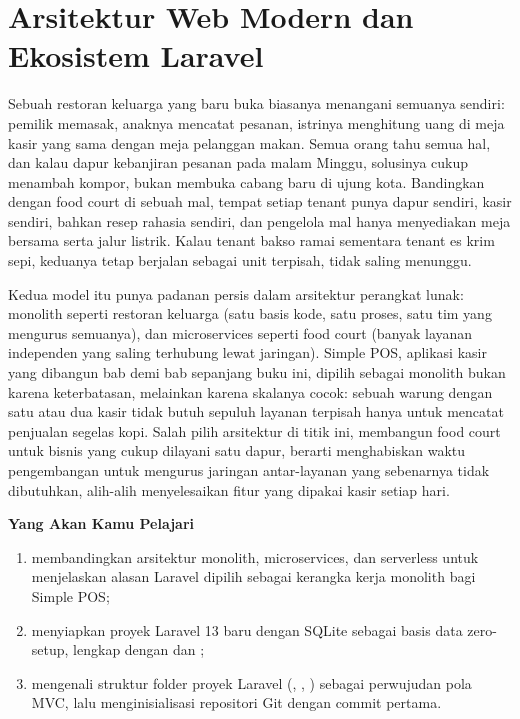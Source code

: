 
\chapter{Arsitektur Web Modern dan Ekosistem Laravel}
\label{ch:arsitektur-web-modern}


Sebuah restoran keluarga yang baru buka biasanya menangani semuanya sendiri:
pemilik memasak, anaknya mencatat pesanan, istrinya menghitung uang di meja
kasir yang sama dengan meja pelanggan makan. Semua orang tahu semua hal, dan
kalau dapur kebanjiran pesanan pada malam Minggu, solusinya cukup menambah
kompor, bukan membuka cabang baru di ujung kota. Bandingkan dengan food
court di sebuah mal, tempat setiap tenant punya dapur sendiri, kasir
sendiri, bahkan resep rahasia sendiri, dan pengelola mal hanya menyediakan
meja bersama serta jalur listrik. Kalau tenant bakso ramai sementara tenant
es krim sepi, keduanya tetap berjalan sebagai unit terpisah, tidak saling
menunggu.

Kedua model itu punya padanan persis dalam arsitektur perangkat lunak:
monolith seperti restoran keluarga (satu basis kode, satu proses, satu tim
yang mengurus semuanya), dan microservices seperti food court (banyak
layanan independen yang saling terhubung lewat jaringan). Simple POS,
aplikasi kasir yang dibangun bab demi bab sepanjang buku ini, dipilih
sebagai monolith bukan karena keterbatasan, melainkan karena skalanya
cocok: sebuah warung dengan satu atau dua kasir tidak butuh sepuluh layanan
terpisah hanya untuk mencatat penjualan segelas kopi. Salah pilih arsitektur
di titik ini, membangun food court untuk bisnis yang cukup dilayani satu
dapur, berarti menghabiskan waktu pengembangan untuk mengurus jaringan
antar-layanan yang sebenarnya tidak dibutuhkan, alih-alih menyelesaikan
fitur yang dipakai kasir setiap hari.

\textbf{Yang Akan Kamu Pelajari}

\begin{enumerate}
  \item membandingkan arsitektur monolith, microservices, dan serverless untuk menjelaskan alasan Laravel dipilih sebagai kerangka kerja monolith bagi Simple POS;
  \item menyiapkan proyek Laravel 13 baru dengan SQLite sebagai basis data zero-setup, lengkap dengan  dan ;
  \item mengenali struktur folder proyek Laravel (, , ) sebagai perwujudan pola MVC, lalu menginisialisasi repositori Git dengan commit  pertama.
\end{enumerate}

